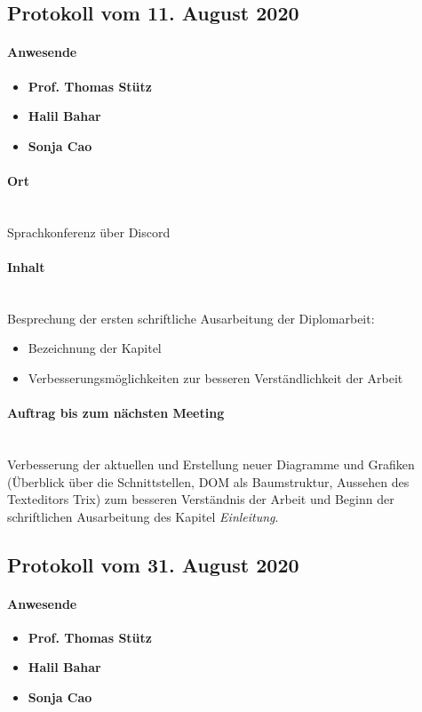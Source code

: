 \subsection{Protokoll vom 11. August 2020}

\paragraph{Anwesende}
\begin{itemize}
	\item{\textbf{Prof. Thomas Stütz}}
	\item{\textbf{Halil Bahar}}
	\item{\textbf{Sonja Cao}}
\end{itemize}

\paragraph{Ort}\mbox{}\\
Sprachkonferenz über Discord

\paragraph{Inhalt}\mbox{}\\
Besprechung der ersten schriftliche Ausarbeitung der Diplomarbeit:
\begin{itemize}
	\item{Bezeichnung der Kapitel}
	\item{Verbesserungsmöglichkeiten zur besseren Verständlichkeit der Arbeit}
\end{itemize}

\paragraph{Auftrag bis zum nächsten Meeting}\mbox{}\\
Verbesserung der aktuellen und Erstellung neuer Diagramme und Grafiken (Überblick über die Schnittstellen, DOM als Baumstruktur, Aussehen des Texteditors Trix) zum besseren Verständnis der Arbeit und Beginn der schriftlichen Ausarbeitung des Kapitel {\em{Einleitung}}.

\subsection{Protokoll vom 31. August 2020}

\paragraph{Anwesende}
\begin{itemize}
	\item{\textbf{Prof. Thomas Stütz}}
	\item{\textbf{Halil Bahar}}
	\item{\textbf{Sonja Cao}}
\end{itemize}

